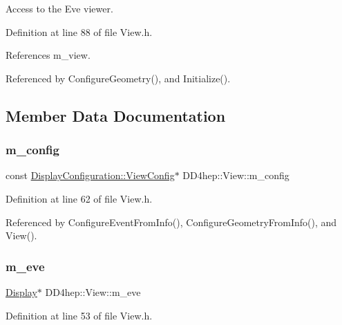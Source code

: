 Access to the Eve viewer. 



Definition at line 88 of file View.\+h.



References m\+\_\+view.



Referenced by Configure\+Geometry(), and Initialize().



\subsection{Member Data Documentation}
\hypertarget{class_d_d4hep_1_1_view_aa661c16c213fd41f49039a8c0e0a96c9}{}\label{class_d_d4hep_1_1_view_aa661c16c213fd41f49039a8c0e0a96c9} 
\subsubsection{\texorpdfstring{m\+\_\+config}{m\_config}}
{\footnotesize\ttfamily const \hyperlink{class_d_d4hep_1_1_display_configuration_1_1_view_config}{Display\+Configuration\+::\+View\+Config}$\ast$ D\+D4hep\+::\+View\+::m\+\_\+config\hspace{0.3cm}{\ttfamily [protected]}}



Definition at line 62 of file View.\+h.



Referenced by Configure\+Event\+From\+Info(), Configure\+Geometry\+From\+Info(), and View().

\hypertarget{class_d_d4hep_1_1_view_a3ec453c7124cf0d8347acd0b0d2febb5}{}\label{class_d_d4hep_1_1_view_a3ec453c7124cf0d8347acd0b0d2febb5} 
\subsubsection{\texorpdfstring{m\+\_\+eve}{m\_eve}}
{\footnotesize\ttfamily \hyperlink{class_d_d4hep_1_1_display}{Display}$\ast$ D\+D4hep\+::\+View\+::m\+\_\+eve\hspace{0.3cm}{\ttfamily [protected]}}



Definition at line 53 of file View.\+h.



